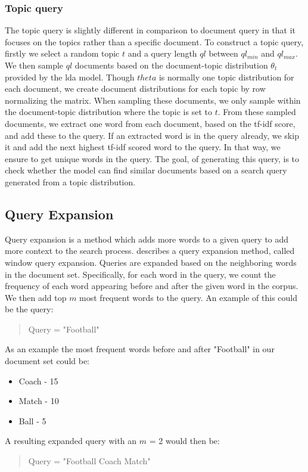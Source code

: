 \subsubsection{Topic query} 
The topic query is slightly different in comparison to document query in that it focuses on the topics rather than a specific document.
To construct a topic query, firstly we select a random topic $t$ and a query length $ql$ between $ql_{min}$ and $ql_{max}$.
We then sample $ql$ documents based on the document-topic distribution $\theta_t$ provided by the \gls{lda} model.
Though $theta$ is normally one topic distribution for each document, we create document distributions for each topic by row normalizing the matrix. 
When sampling these documents, we only sample within the document-topic distribution where the topic is set to $t$.
From these sampled documents, we extract one word from each document, based on the \gls{tf-idf} score, and add these to the query.
If an extracted word is in the query already, we skip it and add the next highest \gls{tf-idf} scored word to the query.
In that way, we ensure to get unique words in the query.
The goal, of generating this query, is to check whether the model can find similar documents based on a search query generated from a topic distribution.

\subsection{Query Expansion}
Query expansion is a method which adds more words to a given query to add more context to the search process.
\citet{yang2009topic} describes a query expansion method, called window query expansion.
Queries are expanded based on the neighboring words in the document set.
Specifically, for each word in the query, we count the frequency of each word appearing before and after the given word in the corpus.
We then add top $m$ most frequent words to the query.
An example of this could be the query: 
\begin{quote}
	Query = "Football"
\end{quote}
As an example the most frequent words before and after "Football" in our document set could be:
\begin{itemize}
	\item Coach - 15
	\item Match - 10
	\item Ball - 5
\end{itemize}
A resulting expanded query with an $m$ = 2 would then be:
\begin{quote}
	Query = "Football Coach Match"
\end{quote}



